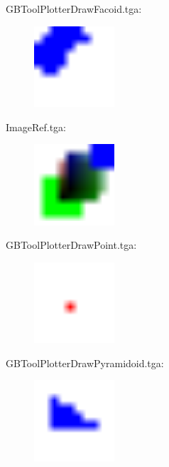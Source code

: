 GBToolPlotterDrawFacoid.tga:\\
\begin{center}
\begin{figure}[H]
\centering\includegraphics[width=3cm]{./GBToolPlotterDrawFacoid.png}\\
\end{figure}
\end{center}

ImageRef.tga:\\
\begin{center}
\begin{figure}[H]
\centering\includegraphics[width=3cm]{./ImageRef.png}\\
\end{figure}
\end{center}

GBToolPlotterDrawPoint.tga:\\
\begin{center}
\begin{figure}[H]
\centering\includegraphics[width=3cm]{./GBToolPlotterDrawPoint.png}\\
\end{figure}
\end{center}

GBToolPlotterDrawPyramidoid.tga:\\
\begin{center}
\begin{figure}[H]
\centering\includegraphics[width=3cm]{./GBToolPlotterDrawPyramidoid.png}\\
\end{figure}
\end{center}

